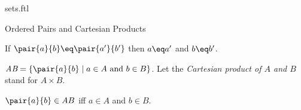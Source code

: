 \documentclass{naproche-library}
\begin{document}
\begin{smodule}[title=Classes and Sets]{sets.ftl}
\begin{sfragment}{Ordered Pairs and Cartesian Products}
  \begin{axiom}[forthel,title=Pair Extensionality Axiom,id=PairExtensionalityAx]
    If $\pair{a}{b}\eq \pair{a'}{b'}$ then $a\eq a'$ and $b\eq b'$.
  \end{axiom}

  \begin{definition}[forthel,id=CartesianProductDef]
    $\emph{A\times B}=\{\pair{a}{b}\mid a\in A\text{ and }b\in B\}$.
    Let the \emph{Cartesian product of $A$ and $B$} stand for $A\times B$.
  \end{definition}

  \begin{proposition}[forthel,id=CartesianProductProp]
    $\pair{a}{b}\in A\times B$ iff $a\in A$ and $b\in B$.
  \end{proposition}
\end{sfragment}
\end{smodule}
\end{document}
